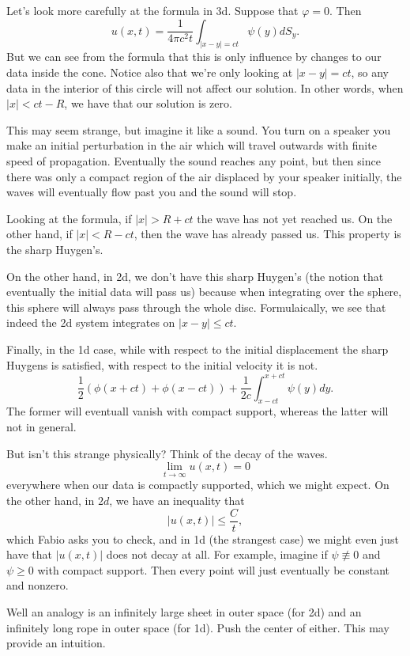 Let's look more carefully at the formula in 3d. Suppose that \( \varphi = 0 \). Then
\[ u(x, t) = \frac{1}{4 \pi c^{2} t} \int_{|x - y| = ct} \psi(y) dS_{y}.  \]
But we can see from the formula that this is only influence by changes to our data inside the cone. Notice also that we're only looking at \( |x - y| = ct \), so any data in the interior of this circle will not affect our solution. In other words, when \( |x| < ct - R \), we have that our solution is zero.

This may seem strange, but imagine it like a sound. You turn on a speaker you make an initial perturbation in the air which will travel outwards with finite speed of propagation. Eventually the sound reaches any point, but then since there was only a compact region of the air displaced by your speaker initially, the waves will eventually flow past you and the sound will stop.

Looking at the formula, if \( |x| > R + ct \) the wave has not yet reached us. On the other hand, if \( |x| < R - ct \), then the wave has already passed us. This property is the sharp Huygen's.

On the other hand, in 2d, we don't have this sharp Huygen's (the notion that eventually the initial data will pass us) because when integrating over the sphere, this sphere will always pass through the whole disc. Formulaically, we see that indeed the 2d system integrates on \( |x - y| \le ct \).

Finally, in the 1d case, while with respect to the initial displacement the sharp Huygens is satisfied, with respect to the initial velocity it is not.
\[ \frac{1}{2} \left( \phi(x + ct) + \phi(x - ct) \right) + \frac{1}{2c} \int_{x - ct}^{x + ct} \psi(y) dy.  \]
The former will eventuall vanish with compact support, whereas the latter will not in general.

But isn't this strange physically? Think of the decay of the waves.
\[ \lim_{t \to \infty} u(x, t) = 0 \]
everywhere when our data is compactly supported, which we might expect. On the other hand, in \( 2d \), we have an inequality that
\[ |u(x, t)| \le \frac{C}{t}, \]
which Fabio asks you to check, and in 1d (the strangest case) we might even just have that \( |u(x, t)| \) does not decay at all. For example, imagine if \( \psi \not \equiv 0 \) and \( \psi \ge 0 \) with compact support. Then every point will just eventually be constant and nonzero.

Well an analogy is an infinitely large sheet in outer space (for 2d) and an infinitely long rope in outer space (for 1d). Push the center of either. This may provide an intuition.

